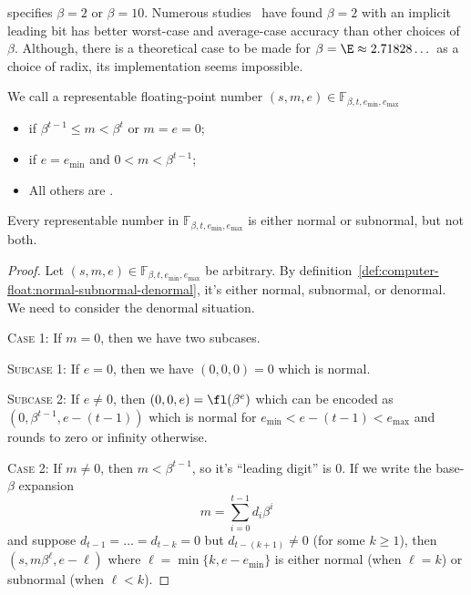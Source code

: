 \begin{rmk}
   specifies $\beta=2$ or $\beta=10$. Numerous studies~\cite{DBLP:journals/corr/abs-1004-3374,10.1145/363235.363240,5009112,10.1145/362003.362013,4039164}
have found $\beta=2$ with an implicit leading bit has better worst-case
and average-case accuracy than other choices of $\beta$. Although, there
is a theoretical case to be made for $\beta=\E\approx2.71828\dots$ as a
choice of radix, its implementation seems impossible.
\end{rmk}


\begin{defn}\label{def:computer-float:normal-subnormal-denormal}
We call a representable floating-point number $(s,m,e)\in\mathbb{F}_{\beta,t,e_{\text{min}},e_{\text{max}}}$
\begin{itemize}
\item{} if $\beta^{t-1}\leq m<\beta^{t}$ or $m=e=0$;
\item{} if $e=e_{\text{min}}$ and $0<m<\beta^{t-1}$;
\item All others are .
\end{itemize}
\end{defn}


\begin{thm}
  Every representable number in $\mathbb{F}_{\beta,t,e_{\text{min}},e_{\text{max}}}$
  is either normal or subnormal, but not both.
\end{thm}
\begin{proof}
  Let  $(s,m,e)\in\mathbb{F}_{\beta,t,e_{\text{min}},e_{\text{max}}}$ be
  arbitrary. By
  definition~\ref{def:computer-float:normal-subnormal-denormal},
  it's either normal, subnormal, or denormal. We need to consider the
  denormal situation.

  \textsc{Case 1:} If $m=0$, then we have two subcases.

  {}\quad\textsc{Subcase 1:} If $e=0$, then we have $(0,0,0)=0$ which is
  normal.

  {}\quad\textsc{Subcase 2:} If $e\neq0$, then $(0,0,e)=\fl(\beta^{e})$
  which can be encoded as $(0,\beta^{t-1}, e-(t-1))$ which is normal for
  $e_{\text{min}}<e-(t-1)<e_{\text{max}}$ and rounds to zero or infinity
  otherwise.
  
  \textsc{Case 2:} If $m\neq0$, then $m<\beta^{t-1}$, so it's ``leading
  digit'' is 0. If we write the base-$\beta$ expansion
  \begin{equation}
    m=\sum^{t-1}_{i=0}d_{i}\beta^{i}
  \end{equation}
  and suppose $d_{t-1}=\dots=d_{t-k}=0$ but $d_{t-(k+1)}\neq0$ (for some
  $k\geq1$), then $(s,m\beta^{\ell},e-\ell)$ where $\ell=\min\{k,e-e_{\text{min}}\}$
  is either normal (when $\ell=k$) or subnormal (when $\ell<k$).
\end{proof}

